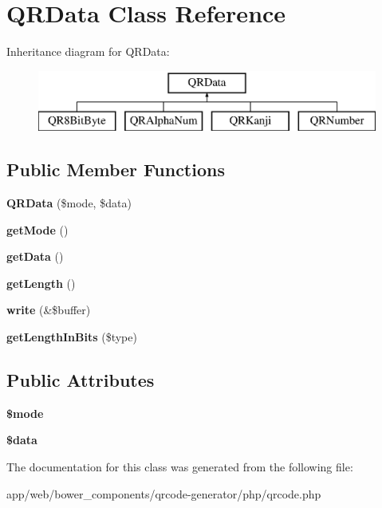 \hypertarget{class_q_r_data}{}\section{Q\+R\+Data Class Reference}
\label{class_q_r_data}
Inheritance diagram for Q\+R\+Data\+:\begin{figure}[H]
\begin{center}
\leavevmode
\includegraphics[height=2.000000cm]{class_q_r_data}
\end{center}
\end{figure}
\subsection*{Public Member Functions}
\begin{DoxyCompactItemize}
\item 
\mbox{\label{class_q_r_data_a823d7870b0702713ecc7782cde18c1bb}} 
{\bfseries Q\+R\+Data} (\$mode, \$data)
\item 
\mbox{\label{class_q_r_data_a265b1535c1b930e65511ef749767a5f0}} 
{\bfseries get\+Mode} ()
\item 
\mbox{\label{class_q_r_data_aaa4f88d37b0896fc31ef27507a654395}} 
{\bfseries get\+Data} ()
\item 
\mbox{\label{class_q_r_data_a699a54fc67add1d05a3ee84032c753cc}} 
{\bfseries get\+Length} ()
\item 
\mbox{\label{class_q_r_data_a8b16aac70271de8a1c320b6cf6899de4}} 
{\bfseries write} (\&\$buffer)
\item 
\mbox{\label{class_q_r_data_aa5cf21c9a81cee3d46bbf8160f2bf19e}} 
{\bfseries get\+Length\+In\+Bits} (\$type)
\end{DoxyCompactItemize}
\subsection*{Public Attributes}
\begin{DoxyCompactItemize}
\item 
\mbox{\label{class_q_r_data_aca2032280a97cbb79cd78d4a9de42b8a}} 
{\bfseries \$mode}
\item 
\mbox{\label{class_q_r_data_a147330763a888dfa1335b6129722e157}} 
{\bfseries \$data}
\end{DoxyCompactItemize}


The documentation for this class was generated from the following file\+:\begin{DoxyCompactItemize}
\item 
app/web/bower\+\_\+components/qrcode-\/generator/php/qrcode.\+php\end{DoxyCompactItemize}

